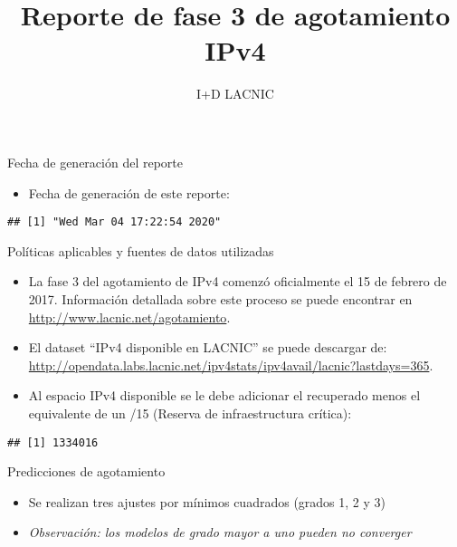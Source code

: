\documentclass[ignorenonframetext,]{beamer}
\title{Reporte de fase 3 de agotamiento IPv4}
\author{I+D LACNIC}
\date{}
\providecommand{\tightlist}{%
  \setlength{\itemsep}{0pt}\setlength{\parskip}{0pt}}
\begin{document}
\frame{\titlepage}

\begin{frame}[fragile]{Fecha de generación del reporte}
\protect\hypertarget{fecha-de-generaciuxf3n-del-reporte}{}

\begin{itemize}
\tightlist
\item
  Fecha de generación de este reporte:
\end{itemize}

\begin{verbatim}
## [1] "Wed Mar 04 17:22:54 2020"
\end{verbatim}

\end{frame}

\begin{frame}[fragile]{Políticas aplicables y fuentes de datos
utilizadas}
\protect\hypertarget{poluxedticas-aplicables-y-fuentes-de-datos-utilizadas}{}

\begin{itemize}
\item
  La fase 3 del agotamiento de IPv4 comenzó oficialmente el 15 de
  febrero de 2017. Información detallada sobre este proceso se puede
  encontrar en \url{http://www.lacnic.net/agotamiento}.
\item
  El dataset ``IPv4 disponible en LACNIC'' se puede descargar de:
  \url{http://opendata.labs.lacnic.net/ipv4stats/ipv4avail/lacnic?lastdays=365}.
\item
  Al espacio IPv4 disponible se le debe adicionar el recuperado menos el
  equivalente de un /15 (Reserva de infraestructura crítica):
\end{itemize}

\begin{verbatim}
## [1] 1334016
\end{verbatim}

\end{frame}

\begin{frame}{Predicciones de agotamiento}
\protect\hypertarget{predicciones-de-agotamiento}{}

\begin{itemize}
\tightlist
\item
  Se realizan tres ajustes por mínimos cuadrados (grados 1, 2 y 3)
\item
  \emph{Observación: los modelos de grado mayor a uno pueden no
  converger}
\end{itemize}

\end{frame}
\end{document}
